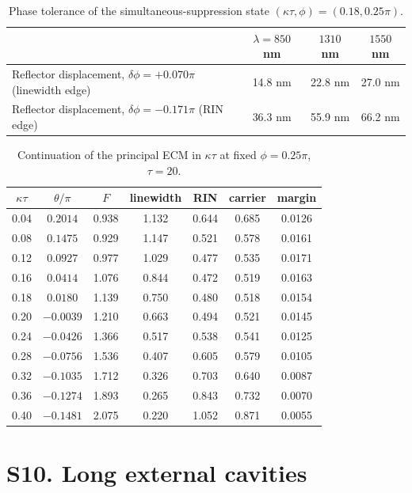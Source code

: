 \documentclass[11pt]{article}
\newif\ifmarked
\newenvironment{revised}{\ifmarked\color{blue}\fi}{}
\begin{document}
\begin{revised}
\begin{table}[h]
\centering
\caption{Phase tolerance of the simultaneous-suppression state $(\kappa\tau,\phi)=(0.18,0.25\pi)$.}
\label{tab:tol}
\begin{tabular}{lccc}
\toprule
& $\lambda=850$ nm & $1310$ nm & $1550$ nm\\
\midrule
Reflector displacement, $\delta\phi=+0.070\pi$ (linewidth edge) & 14.8 nm & 22.8 nm & 27.0 nm\\
Reflector displacement, $\delta\phi=-0.171\pi$ (RIN edge) & 36.3 nm & 55.9 nm & 66.2 nm\\
\bottomrule
\end{tabular}
\end{table}

\begin{table}[h]
\centering
\caption{Continuation of the principal ECM in $\kappa\tau$ at fixed $\phi=0.25\pi$, $\tau=20$.}
\label{tab:kcont}
\begin{tabular}{ccccccc}
\toprule
$\kappa\tau$ & $\theta/\pi$ & $F$ & linewidth & RIN & carrier & margin\\
\midrule
0.04 & $0.2014$ & 0.938 & 1.132 & 0.644 & 0.685 & 0.0126\\
0.08 & $0.1475$ & 0.929 & 1.147 & 0.521 & 0.578 & 0.0161\\
0.12 & $0.0927$ & 0.977 & 1.029 & 0.477 & 0.535 & 0.0171\\
0.16 & $0.0414$ & 1.076 & 0.844 & 0.472 & 0.519 & 0.0163\\
0.18 & $0.0180$ & 1.139 & 0.750 & 0.480 & 0.518 & 0.0154\\
0.20 & $-0.0039$ & 1.210 & 0.663 & 0.494 & 0.521 & 0.0145\\
0.24 & $-0.0426$ & 1.366 & 0.517 & 0.538 & 0.541 & 0.0125\\
0.28 & $-0.0756$ & 1.536 & 0.407 & 0.605 & 0.579 & 0.0105\\
0.32 & $-0.1035$ & 1.712 & 0.326 & 0.703 & 0.640 & 0.0087\\
0.36 & $-0.1274$ & 1.893 & 0.265 & 0.843 & 0.732 & 0.0070\\
0.40 & $-0.1481$ & 2.075 & 0.220 & 1.052 & 0.871 & 0.0055\\
\bottomrule
\end{tabular}
\end{table}

\section*{S10. Long external cavities}


\end{revised}
\end{document}
